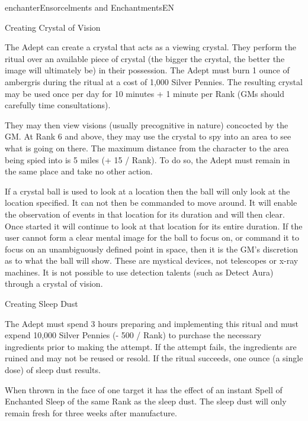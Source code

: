 \begin{college}[1.1]{enchanter}{Ensorcelments and Enchantments}{EN}
\begin{ritual}[Q-2]{Creating Crystal of Vision}

\begin{effects}
The Adept can create a crystal that acts as a viewing crystal.  They
perform the ritual over an available piece of crystal (the bigger the
crystal, the better the image will ultimately be) in their possession.
The Adept must burn 1 ounce of ambergris during the ritual at a cost
of 1,000 Silver Pennies. The resulting crystal may be used once per
day for 10 minutes + 1 minute per Rank (GMs should carefully time
consultations).

They may then view visions (usually precognitive in nature) concocted
by the GM. At Rank 6 and above, they may use the crystal to spy into
an area to see what is going on there. The maximum distance from the
character to the area being spied into is 5 miles (+ 15 / Rank). To do
so, the Adept must remain in the same place and take no other action.

If a crystal ball is used to look at a location then the ball will
only look at the location specified. It can not then be commanded to
move around. It will enable the observation of events in that location
for its duration and will then clear. Once started it will continue to
look at that location for its entire duration.  If the user cannot
form a clear mental image for the ball to focus on, or command it to
focus on an unambiguously defined point in space, then it is the GM's
discretion as to what the ball will show.  These are mystical devices,
not telescopes or x-ray machines.  It is not possible to use detection
talents (such as Detect Aura) through a crystal of vision.
\end{effects}
\end{ritual}

\begin{ritual}[Q-3]{Creating Sleep Dust}

\begin{effects}
The Adept must spend 3 hours preparing and implementing this ritual
and must expend 10,000 Silver Pennies (- 500 / Rank) to purchase the
necessary ingredients prior to making the attempt. If the attempt
fails, the ingredients are ruined and may not be reused or resold. If
the ritual succeeds, one ounce (a single dose) of sleep dust results.

When thrown in the face of one target it has the effect of an instant
Spell of Enchanted Sleep of the same Rank as the sleep dust. The sleep
dust will only remain fresh for three weeks after manufacture.


\end{effects}
\end{ritual}
\end{college}
